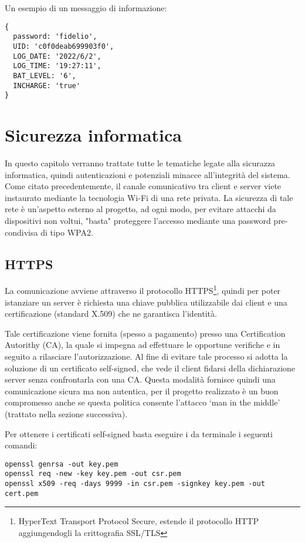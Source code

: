 \documentclass[target=bach]{thud}
\begin{document}
    Un esempio di un messaggio di informazione:
\begin{lstlisting}
{
  password: 'fidelio',
  UID: 'c0f0deab699903f0',
  LOG_DATE: '2022/6/2',
  LOG_TIME: '19:27:11',
  BAT_LEVEL: '6',
  INCHARGE: 'true'
}
\end{lstlisting}

\chapter{Sicurezza informatica}
In questo capitolo verranno trattate tutte le tematiche legate alla sicurazza informatica, quindi autenticazioni e potenziali minacce all'integrità del sistema.
Come citato precedentemente, il canale comunicativo tra client e server viete instaurato mediante la tecnologia Wi-Fi di una rete privata.
La sicurezza di tale rete è un'aspetto esterno al progetto, ad ogni modo, per evitare attacchi da dispositivi non voltui, "basta" proteggere l'accesso mediante una password pre-condivisa di tipo WPA2.

\section{HTTPS}

    La comunicazione avviene attraverso il protocollo HTTPS\footnote[1]{HyperText Transport Protocol Secure, estende il protocollo HTTP aggiungendogli la crittografia SSL/TLS}, quindi per poter istanziare un server è richiesta una chiave pubblica utilizzabile dai client e una certificazione (standard X.509) che ne garantisca l'identità.

    Tale certificazione viene fornita (spesso a pagamento) presso una Certification Autorithy (CA), la quale si impegna ad effettuare le opportune verifiche e in seguito a rilasciare l'autorizzazione. Al fine di evitare tale processo si adotta la soluzione di un certificato self-signed, che vede il client fidarsi della dichiarazione server senza confrontarla con una CA.
    Questa modalità fornisce quindi una comunicazione sicura ma non autentica, per il progetto realizzato è un buon compromesso anche se questa politica consente l'attacco `man in the middle' (trattato nella sezione successiva).

    Per ottenere i certificati self-signed basta eseguire i da terminale i seguenti comandi:
\begin{lstlisting}
openssl genrsa -out key.pem
openssl req -new -key key.pem -out csr.pem
openssl x509 -req -days 9999 -in csr.pem -signkey key.pem -out cert.pem
\end{lstlisting}
\end{document}

